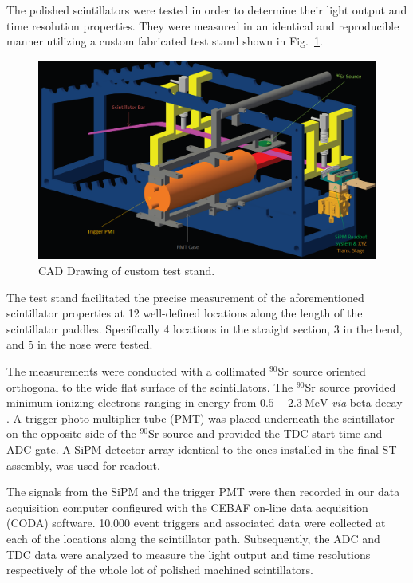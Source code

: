 The polished scintillators were tested in order to determine their light output and time resolution properties.  They were measured in an identical and reproducible manner utilizing a custom fabricated test stand shown in Fig.~\ref{fig:test_stand_model}. 
	\begin{figure}[!htb]
		\centering
		\includegraphics[width=1.0\columnwidth]{fabrication/figs/test_stand_model}
		\caption{CAD Drawing of custom test stand.}
		\label{fig:test_stand_model}
	\end{figure}
The test stand facilitated the precise measurement of the aforementioned scintillator properties at 12 well-defined locations along the length of the scintillator paddles.  Specifically 4 locations in the straight section, 3 in the bend, and 5 in the nose were tested.  

The measurements were conducted with a collimated $\mathrm{^{90}Sr}$ source oriented orthogonal to the wide flat surface of the scintillators.  The $\mathrm{^{90}Sr}$ source provided minimum ionizing electrons ranging in energy from $\mathrm{0.5-2.3~MeV}$ \textit{via} beta-decay \cite{nndc_sr90}\cite{nndc_y90}.  A trigger photo-multiplier tube (PMT) was placed underneath the scintillator on the opposite side of the $\mathrm{^{90}Sr}$ source and provided the TDC start time and ADC gate.  A SiPM detector array identical to the ones installed in the final ST assembly, was used for readout.  

The signals from the SiPM and the trigger PMT were then recorded in our data acquisition computer configured with the CEBAF on-line data acquisition (CODA) software.  10,000 event triggers and associated data were collected at each of the locations along the scintillator path.  Subsequently, the ADC and TDC data were analyzed to measure the light output and time resolutions respectively of the whole lot of polished machined scintillators.  

